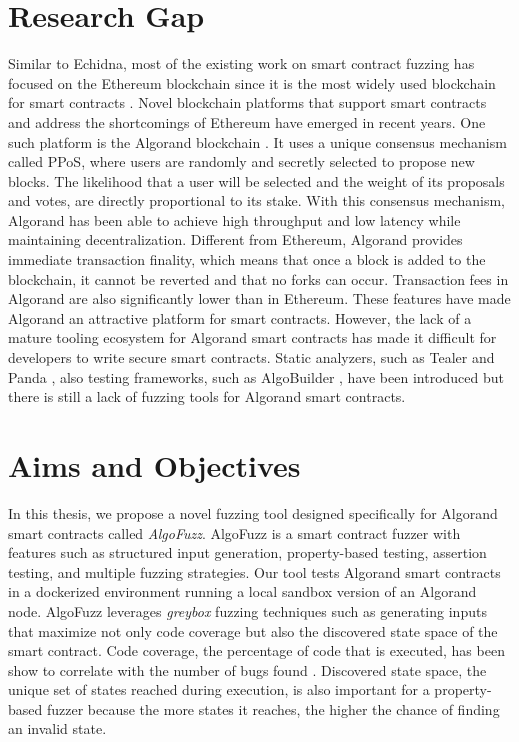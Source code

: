 \section*{Research Gap}
Similar to Echidna, most of the existing work on smart contract fuzzing has focused on the Ethereum blockchain since it is the most widely used blockchain for smart contracts \cite{guo_analysis_2022}.
Novel blockchain platforms that support smart contracts and address the shortcomings of Ethereum have emerged in recent years.
One such platform is the Algorand blockchain \cite{chen_algorand_2019}.
It uses a unique consensus mechanism called \ac{PPoS}, where users are randomly and secretly selected to propose new blocks.
The likelihood that a user will be selected and the weight of its proposals and votes, are directly proportional to its stake.
With this consensus mechanism, Algorand has been able to achieve high throughput and low latency while maintaining decentralization.
Different from Ethereum, Algorand provides immediate transaction finality, which means that once a block is added to the blockchain, it cannot be reverted and that no forks can occur.
Transaction fees in Algorand are also significantly lower than in Ethereum.
These features have made Algorand an attractive platform for smart contracts.
However, the lack of a mature tooling ecosystem for Algorand smart contracts has made it difficult for developers to write secure smart contracts.
Static analyzers, such as Tealer \cite{noauthor_crytictealer_nodate} and Panda \cite{sun_panda_2023}, also testing frameworks, such as AlgoBuilder \cite{noauthor_algo_nodate}, have been introduced but there is still a lack of fuzzing tools for Algorand smart contracts.

\section*{Aims and Objectives}
In this thesis, we propose a novel fuzzing tool designed specifically for Algorand smart contracts called \textit{AlgoFuzz}.
AlgoFuzz is a smart contract fuzzer with features such as structured input generation, property-based testing, assertion testing, and multiple fuzzing strategies.
Our tool tests Algorand smart contracts in a dockerized environment running a local sandbox version of an Algorand node.
AlgoFuzz leverages \textit{greybox} fuzzing techniques such as generating inputs that maximize not only code coverage but also the discovered state space of the smart contract.
Code coverage, the percentage of code that is executed, has been show to correlate with the number of bugs found \cite{kochhar_code_2015}.
Discovered state space, the unique set of states reached during execution, is also important for a property-based fuzzer because the more states it reaches, the higher the chance of finding an invalid state.

